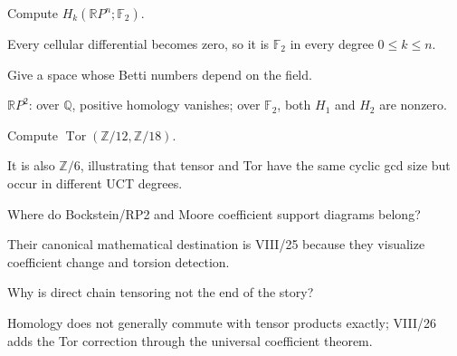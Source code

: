 \begin{problem}\label{prob:viii25-20}
Compute \(H_k(\mathbb RP^n;\mathbb F_2)\).
\end{problem}
\begin{solution}
Every cellular differential becomes zero, so it is \(\mathbb F_2\) in every degree \(0\le k\le n\).
\end{solution}

\begin{problem}\label{prob:viii25-21}
Give a space whose Betti numbers depend on the field.
\end{problem}
\begin{solution}
\(\mathbb RP^2\): over \(\mathbb Q\), positive homology vanishes; over \(\mathbb F_2\), both \(H_1\) and \(H_2\) are nonzero.
\end{solution}

\begin{problem}\label{prob:viii25-22}
Compute \(\operatorname{Tor}(\mathbb Z/12,\mathbb Z/18)\).
\end{problem}
\begin{solution}
It is also \(\mathbb Z/6\), illustrating that tensor and Tor have the same cyclic gcd size but occur in different UCT degrees.
\end{solution}

\begin{problem}\label{prob:viii25-23}
Where do Bockstein/RP2 and Moore coefficient support diagrams belong?
\end{problem}
\begin{solution}
Their canonical mathematical destination is VIII/25 because they visualize coefficient change and torsion detection.
\end{solution}

\begin{problem}[Bridge]\label{prob:viii25-24}
Why is direct chain tensoring not the end of the story?
\end{problem}
\begin{solution}
Homology does not generally commute with tensor products exactly; VIII/26 adds the Tor correction through the universal coefficient theorem.
\end{solution}
